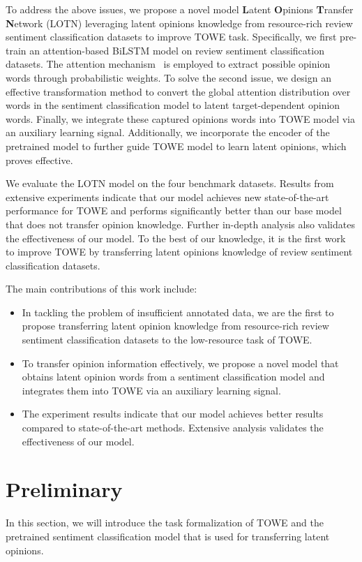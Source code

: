 \documentclass[letterpaper]{article} \usepackage{aaai20}  \usepackage{times}  \usepackage{helvet} \usepackage{courier}  \usepackage[hyphens]{url}  \usepackage{graphicx} \urlstyle{rm} \def\UrlFont{\rm}  \usepackage{graphicx}
\begin{document}
To address the above issues, we propose a novel model \textbf{L}atent \textbf{O}pinions \textbf{T}ransfer \textbf{N}etwork (LOTN) leveraging latent opinions knowledge from resource-rich review sentiment classification datasets to improve TOWE task. Specifically, we first pre-train an attention-based BiLSTM model on review sentiment classification datasets. The attention mechanism~\cite{DBLP:journals/corr/BahdanauCB14} is employed to extract possible opinion words through probabilistic weights. To solve the second issue, we design an effective transformation method to convert the global attention distribution over words in the sentiment classification model to latent target-dependent opinion words. Finally, we integrate these captured opinions words into TOWE model via an auxiliary learning signal. Additionally, we incorporate the encoder of the pretrained model to further guide TOWE model to learn latent opinions, which proves effective.

We evaluate the LOTN model on the four benchmark datasets. Results from extensive experiments indicate that our model achieves new state-of-the-art performance for TOWE and performs significantly better than our base model that does not transfer opinion knowledge. Further in-depth analysis also validates the effectiveness of our model. To the best of our knowledge, it is the first work to improve TOWE by transferring latent opinions knowledge of review sentiment classification datasets.

The main contributions of this work include:
\begin{itemize}
	\item In tackling the problem of insufficient annotated data, we are the first to propose transferring latent opinion knowledge from resource-rich review sentiment classification datasets to the low-resource task of TOWE.
	\item To transfer opinion information effectively, we propose a novel model that obtains latent opinion words from a sentiment classification model and integrates them into TOWE via an auxiliary learning signal.
	\item The experiment results indicate that our model achieves better results compared to state-of-the-art methods. Extensive analysis validates the effectiveness of our model.
\end{itemize}

\section{Preliminary}
In this section, we will introduce the task formalization of TOWE and the pretrained sentiment classification model that is used for transferring latent opinions.
\end{document}
